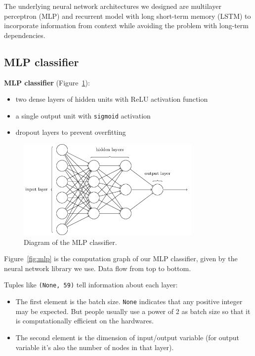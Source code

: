 \documentclass[11pt,a4paper]{report}
\begin{document}
The underlying neural network architectures we designed are multilayer perceptron (MLP) and recurrent model with long short-term memory (LSTM) \parencite{hochreiter1997long} to incorporate information from context while avoiding the problem with long-term dependencies.

\subsection{MLP classifier}

\begin{mdframed}
\noindent \textbf{MLP classifier} (Figure~\ref{fig:mlp-draw}):
\begin{itemize}
  \item two dense layers of hidden units with ReLU \parencite{nair2010rectified} activation function
  \item a single output unit with \texttt{sigmoid} activation
  \item dropout \parencite{srivastava2014dropout} layers to prevent overfitting
\end{itemize}
\end{mdframed}

\begin{figure}[htbp]
  \centering
  \includegraphics[width=0.8\textwidth]{mlp.png}
  \caption{Diagram of the MLP classifier.} \label{fig:mlp-draw}
\end{figure}

Figure~\ref{fig:mlp} is the computation graph of our MLP classifier, given by the neural network library we use.
Data flow from top to bottom.

Tuples like \texttt{(None, 59)} tell information about each layer:

\begin{itemize}
  \item The first element is the batch size.
    \texttt{None} indicates that any positive integer may be expected.
    But people usually use a power of 2 as batch size so that it is computationally efficient on the hardwares.
  \item The second element is the dimension of input/output variable (for output variable it's also the number of nodes in that layer).
\end{itemize}
\end{document}
